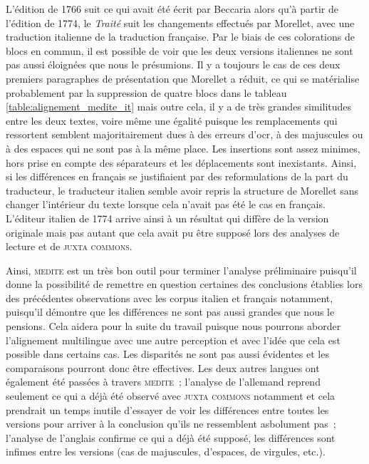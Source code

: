 L'édition de 1766 suit ce qui avait été écrit par Beccaria alors qu'à partir de l'édition de 1774, le \emph{Traité} suit les changements effectués par Morellet, avec une traduction italienne de la traduction française. Par le biais de ces colorations de blocs en commun, il est possible de voir que les deux versions italiennes ne sont pas aussi éloignées que nous le présumions. Il y a toujours le cas de ces deux premiers paragraphes de présentation que Morellet a réduit, ce qui se matérialise probablement par la suppression de quatre blocs dans le tableau \ref{table:alignement_medite_it} mais outre cela, il y a de très grandes similitudes entre les deux textes, voire même une égalité puisque les remplacements qui ressortent semblent majoritairement dues à des erreurs d'\acrshort{ocr}, à des majuscules ou à des espaces qui ne sont pas à la même place. Les insertions sont assez minimes, hors prise en compte des séparateurs et les déplacements sont inexistants. Ainsi, si les différences en français se justifiaient par des reformulations de la part du traducteur, le traducteur italien semble avoir repris la structure de Morellet sans changer l'intérieur du texte lorsque cela n'avait pas été le cas en français. L'éditeur italien de 1774 arrive ainsi à un résultat qui diffère de la version originale mais pas autant que cela avait pu être supposé lors des analyses de lecture et de \textsc{juxta commons}.

Ainsi, \textsc{medite} est un très bon outil pour terminer l'analyse préliminaire puisqu'il donne la possibilité de remettre en question certaines des conclusions établies lors des précédentes observations avec les corpus italien et français notamment, puisqu'il démontre que les différences ne sont pas aussi grandes que nous le pensions. Cela aidera pour la suite du travail puisque nous pourrons aborder l'alignement multilingue avec une autre perception et avec l'idée que cela est possible dans certains cas. Les disparités ne sont pas aussi évidentes et les comparaisons pourront donc être effectives. Les deux autres langues ont également été passées à travers \textsc{medite}~; l'analyse de l'allemand reprend seulement ce qui a déjà été observé avec \textsc{juxta commons} notamment et cela prendrait un temps inutile d'essayer de voir les différences entre toutes les versions pour arriver à la conclusion qu'ils ne ressemblent asbolument pas~; l'analyse de l'anglais confirme ce qui a déjà été supposé, les différences sont infimes entre les versions (cas de majuscules, d'espaces, de virgules, etc.).

